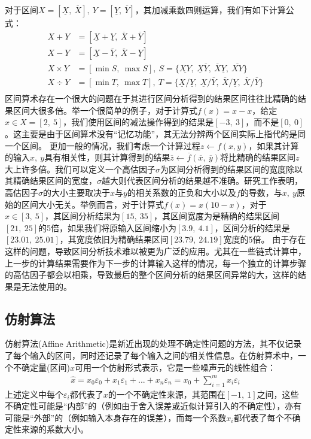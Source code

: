 对于区间$X = [\underline{X},\ \overline{X}],\ Y = [\underline{Y},\  \overline{Y}]$，其加减乘数四则运算，我们有如下计算公式：
\begin{align*}
    X + Y & = [\underline{X} + \underline{Y},\ \overline{X} + \overline{Y}] \\
    X - Y & = [\underline{X} - \overline{Y},\ \overline{X} - \underline{Y}] \\
    X \times Y & = [\min S ,\ \max S],\ S = \{\underline{XY},\ \underline{X}\overline{Y},\ \overline{X}\underline{Y},\ \overline{XY}\} \\
    X \div Y & = [\min T,\ \max T],\ T = \{\underline{X}/\underline{Y},\ \underline{X}/\overline{Y},\ \overline{X}/\underline{Y},\ \overline{X}/\overline{Y} \} \\
\end{align*}
区间算术存在一个很大的问题在于其进行区间分析得到的结果区间往往比精确的结果区间大很多倍。举一个很简单的例子，对于计算式$f(x) = x - x$，给定$x \in X = [2,\ 5]$，我们使用区间的减法操作得到的结果是$[-3,\ 3]$，而不是$[0,\ 0]$。这主要是由于区间算术没有“记忆功能”，其无法分辨两个区间实际上指代的是同一个区间。
更加一般的情况，我们考虑一个计算过程$z \leftarrow f(x, y)$，如果其计算的输入$x,\  y$具有相关性，则其计算得到的结果$\overline{z} \leftarrow \overline{f}(\overline{x},\ \overline{y})$将比精确的结果区间$z$大上许多倍。我们可以定义一个高估因子$\sigma$为区间分析得到的结果区间的宽度除以其精确结果区间的宽度，$\sigma$越大则代表区间分析的结果越不准确。研究工作表明，高估因子$\sigma$的大小主要取决于$x$与$y$的相关系数的正负和大小以及$f$的导数，与$x,\ y$原始的区间大小无关。举例而言，对于计算式$f(x)=x(10-x)$，对于$x \in [3,\ 5]$，其区间分析结果为$[15,\ 35]$，其区间宽度为是精确的结果区间$[21,\ 25]$的5倍，如果我们将原输入区间缩小为$[3.9,\ 4.1]$，区间分析的结果是$[23.01,\ 25.01]$，其宽度依旧为精确结果区间$[23.79,\ 24.19]$宽度的5倍。
由于存在这样的问题，导致区间分析技术难以被更为广泛的应用。尤其在一些链式计算中，上一步的计算结果需要作为下一步的计算输入这样的情况，每一个独立的计算步骤的高估因子都会以相乘，导致最后的整个区间分析的结果区间异常的大，这样的结果是无法使用的。

\subsection{仿射算法}

仿射算法(Affine Arithmetic)是新近出现的处理不确定性问题的方法，其不仅记录了每个输入的区间，同时还记录了每个输入之间的相关性信息。在仿射算术中，一个不确定量(区间)$x$可用一个仿射形式表示，它是一些噪声元的线性组合：
\begin{align*}
    \hat{x}  = x_0\varepsilon_0 + x_1\varepsilon_1 + ... + x_n\varepsilon_n = x_0 + \sum_{i=1}^{m}x_i\varepsilon_i
\end{align*}
上述定义中每个$\varepsilon_i$都代表了$x$的一个不确定性来源，其范围在$[-1,\ 1]$之间，这些不确定性可能是“内部”的（例如由于舍入误差或近似计算引入的不确定性），亦有可能是“外部”的（例如输入本身存在的误差），而每一个系数$x_i$都代表了每个不确定性来源的系数大小。

